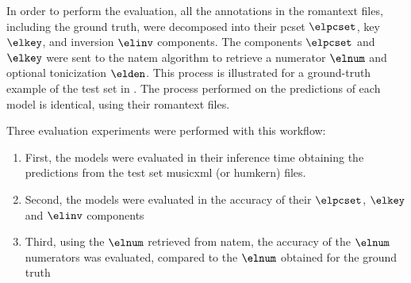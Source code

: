 
In order to perform the evaluation, all the annotations in
the \gls{romantext} files, including the ground truth, were
decomposed into their \gls{pcset} $\elpcset$, key $\elkey$,
and inversion $\elinv$ components. The components $\elpcset$
and $\elkey$ were sent to the \gls{natem} algorithm to
retrieve a numerator $\elnum$ and optional tonicization
$\elden$. This process is illustrated for a ground-truth
example of the test set in . The
process performed on the predictions of each model is
identical, using their \gls{romantext} files.

Three evaluation experiments were performed with this
workflow:
\begin{enumerate}
    \item First, the models were evaluated in their
    inference time obtaining the predictions from the test
    set \gls{musicxml} (or \gls{humkern}) files.
    \item Second, the models were evaluated in the accuracy
    of their $\elpcset$, $\elkey$ and $\elinv$ components
    \item Third, using the $\elnum$ retrieved from
    \gls{natem}, the accuracy of the $\elnum$ numerators was
    evaluated, compared to the $\elnum$ obtained for the
    ground truth
\end{enumerate}





